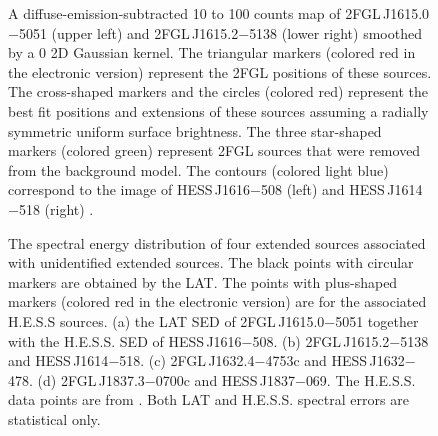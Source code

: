 \documentclass[12pt,preprint]{aastex}
\newif\ifcolorfigure
\newcommand{\gev}{\text{GeV}\xspace}
\newcommand{\tev}{\text{TeV}\xspace}
\begin{document}
\begin{figure}
    \ifcolorfigure
      \plotone{source_plots/source_HESS_J1614-518_color.eps}
    \else
    \fi
  \caption{
    A diffuse-emission-subtracted 10 \gev to 100 \gev counts
    map of 2FGL\,J1615.0$-$5051 (upper left)
    and 2FGL\,J1615.2$-$5138 (lower right) smoothed by a 0
    2D Gaussian kernel.  The triangular markers (colored red in the
    electronic version) represent the 2FGL positions of these sources.
    The cross-shaped markers and the
    circles (colored red) represent the best fit
    positions and extensions of these sources assuming a radially
    symmetric uniform surface brightness.  The three star-shaped
    markers (colored
    green) represent 2FGL sources that were removed from the background
    model.  The contours (colored light blue) correspond to the \tev
    image of HESS\,J1616$-$508 (left) and HESS\,J1614$-$518 (right)
    \citep{hess_plane_survey}.   
    }\label{1FGL_J1613.6-5100c}
\end{figure}


\clearpage
\begin{figure}
    \ifcolorfigure
      \plotone{summary_plots/hess_seds_color.eps}
    \else
    \fi
    \caption{
    The spectral energy distribution of four extended
    sources associated with unidentified
    extended \tev sources.  The black points
    with circular markers are obtained by the LAT. The points with
    plus-shaped markers (colored red in the electronic version) are
    for the associated H.E.S.S sources.  (a) the
    LAT SED of 2FGL\,J1615.0$-$5051 together with the H.E.S.S. SED
    of HESS\,J1616$-$508. (b) 2FGL\,J1615.2$-$5138
    and HESS\,J1614$-$518. (c) 2FGL\,J1632.4$-$4753c
    and HESS\,J1632$-$478. (d) 2FGL\,J1837.3$-$0700c
    and HESS\,J1837$-$069. The H.E.S.S. data points are from
    \citep{hess_plane_survey}. Both LAT and H.E.S.S. spectral errors are
    statistical only.}
    \label{hess_seds}
  \end{figure}
\end{document}

